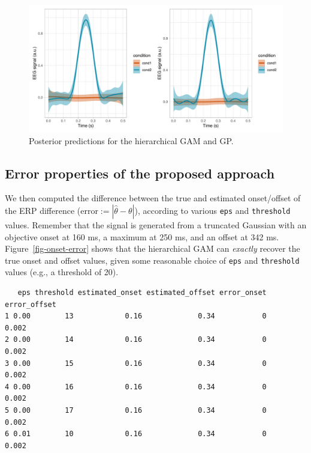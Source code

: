 \documentclass[
  doc,
  floatsintext,
  longtable,
  a4paper,
  nolmodern,
  notxfonts,
  notimes,
  colorlinks=true,linkcolor=blue,citecolor=blue,urlcolor=blue]{apa7}
\begin{document}
\begin{figure}[H]

\caption{Posterior predictions for the hierarchical GAM and GP.}

{\centering \includegraphics[width=1\textwidth,height=\textheight]{brms_meeg_files/figure-pdf/meta-gp-preds-1.pdf}

}

\end{figure}%

\newpage

\subsection{Error properties of the proposed
approach}\label{error-properties-of-the-proposed-approach}

We then computed the difference between the true and estimated
onset/offset of the ERP difference
(\(\text{error}:=|\hat{\theta}-\theta|\)), according to various
\texttt{eps} and \texttt{threshold} values. Remember that the signal is
generated from a truncated Gaussian with an objective onset at 160 ms, a
maximum at 250 ms, and an offset at 342 ms. Figure~\ref{fig-onset-error}
shows that the hierarchical GAM can \emph{exactly} recover the true
onset and offset values, given some reasonable choice of \texttt{eps}
and \texttt{threshold} values (e.g., a threshold of 20).

\begin{verbatim}
   eps threshold estimated_onset estimated_offset error_onset error_offset
1 0.00        13            0.16             0.34           0        0.002
2 0.00        14            0.16             0.34           0        0.002
3 0.00        15            0.16             0.34           0        0.002
4 0.00        16            0.16             0.34           0        0.002
5 0.00        17            0.16             0.34           0        0.002
6 0.01        10            0.16             0.34           0        0.002
\end{verbatim}
\end{document}
